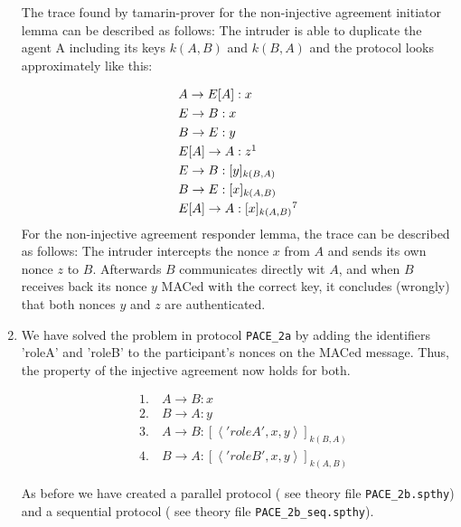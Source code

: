 \documentclass[a4paper,11pt]{scrartcl}
\newcommand{\tuple}[1]{\left\langle #1\right\rangle}
\begin{document}
\begin{enumerate}[label=\alph*)]
The trace found by tamarin-prover for the non-injective agreement initiator lemma can be described as follows: The intruder is able to duplicate the agent A including its keys $k(A,B)$ and $k(B,A)$ and the protocol looks approximately like this:

\begin{align*}
&A \rightarrow E[A]: x\\
&E \rightarrow B: x\\
&B \rightarrow E: y\\
&E[A] \rightarrow A: z \footnotemark\\
&E \rightarrow B: [y]_{k(B,A)}\\
&B \rightarrow E: [x]_{k(A,B)}\\
&E[A]\rightarrow A: [x]_{k(A,B)} \footnotemark[7]
\end{align*}
 \newline
For the non-injective agreement responder lemma, the trace can be described as follows: The intruder intercepts the nonce $x$ from $A$ and sends its own nonce $z$ to $B$. Afterwards $B$ communicates directly wit $A$, and when $B$ receives back its nonce $y$ MACed with the correct key, it concludes (wrongly) that both nonces $y$ and $z$ are authenticated.
\newpage
\item We have solved the problem in protocol  \texttt{PACE_2a} by adding the identifiers 'roleA' and 'roleB' to the participant's nonces on the MACed message.  Thus, the property of the injective agreement now holds for both.

\begin{align*}
&\text{1.} \quad A \rightarrow B: x\\
&\text{2.} \quad B \rightarrow A: y\\
&\text{3.} \quad A \rightarrow B: [\tuple{'roleA', x, y}]_{k(B,A)}\\
&\text{4.} \quad B \rightarrow A: [\tuple{'roleB', x, y}]_{k(A,B)}
\end{align*}

As before we have created a parallel protocol ( see theory file \texttt{PACE\_2b.spthy}) and a sequential protocol ( see theory file \texttt{PACE\_2b\_seq.spthy}).
\end{enumerate}
\end{document}
